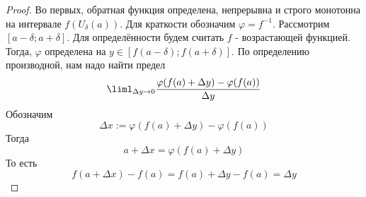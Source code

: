 \begin{proof}
	Во первых, обратная функция определена, непрерывна и строго монотонна на интервале $f(U_{\delta}(a))$. Для краткости обозначим $\varphi = f^{-1}$. Рассмотрим $[a - \delta; a + \delta]$. Для определённости будем считать $f$ - возрастающей функцией. Тогда, $\varphi$ определена на $y \in [f(a - \delta); f(a + \delta)]$. По определению производной, нам надо найти предел
	$$
		\liml_{\Delta y \to 0} \frac{\varphi(f(a) + \Delta y) - \varphi(f(a))}{\Delta y}
	$$
	Обозначим
	$$
		\Delta x := \varphi(f(a) + \Delta y) - \varphi(f(a))
	$$
	Тогда
	$$
		a + \Delta x = \varphi(f(a) + \Delta y)
	$$
	То есть
	$$
		f(a + \Delta x) - f(a) = f(a) + \Delta y - f(a) = \Delta y
	$$
\end{proof}